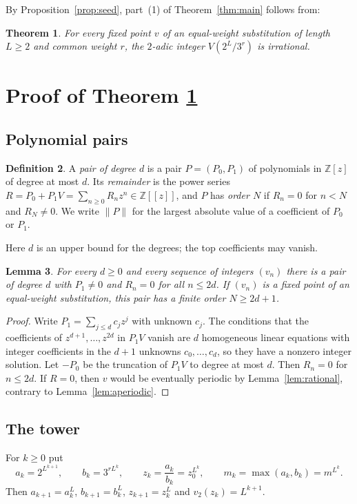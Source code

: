 \documentclass[11pt,reqno]{amsart}
\newtheorem{theorem}{Theorem}[section]
\newtheorem{lemma}[theorem]{Lemma}
\theoremstyle{definition}
\newtheorem{definition}[theorem]{Definition}
\theoremstyle{remark}
\newcommand{\Z}{\mathbb{Z}}
\newcommand{\vt}{v_2}
\begin{document}
By Proposition~\ref{prop:seed}, part~(1) of Theorem~\ref{thm:main} follows
from:

\begin{theorem}\label{thm:value}
For every fixed point $v$ of an equal-weight substitution of length $L\ge 2$
and common weight $r$, the $2$-adic integer $V(2^{L}/3^{r})$ is irrational.
\end{theorem}

\section{Proof of Theorem \ref{thm:value}}\label{sec:proof}

\subsection{Polynomial pairs}

\begin{definition}
A \emph{pair of degree $d$} is a pair $P=(P_0,P_1)$ of polynomials in
$\Z[z]$ of degree at most $d$.  Its \emph{remainder} is the power series
$R=P_0+P_1V=\sum_{n\ge 0}R_nz^{n}\in\Z[[z]]$, and $P$ has \emph{order $N$}
if $R_n=0$ for $n<N$ and $R_N\ne 0$.  We write $\|P\|$ for the largest
absolute value of a coefficient of $P_0$ or $P_1$.
\end{definition}

Here $d$ is an upper bound for the degrees; the top coefficients may vanish.

\begin{lemma}\label{lem:pair}
For every $d\ge 0$ and every sequence of integers $(v_n)$ there is a pair
of degree $d$ with $P_1\ne 0$ and $R_n=0$ for all $n\le 2d$.  If $(v_n)$ is
a fixed point of an equal-weight substitution, this pair has a finite
order $N\ge 2d+1$.
\end{lemma}

\begin{proof}
Write $P_1=\sum_{j\le d}c_jz^{j}$ with unknown $c_j$.  The conditions that
the coefficients of $z^{d+1},\dots,z^{2d}$ in $P_1V$ vanish are $d$
homogeneous linear equations with integer coefficients in the $d+1$
unknowns $c_0,\dots,c_d$, so they have a nonzero integer solution.  Let
$-P_0$ be the truncation of $P_1V$ to degree at most $d$.  Then $R_n=0$ for
$n\le 2d$.  If $R=0$, then $v$ would be eventually periodic by
Lemma~\ref{lem:rational}, contrary to Lemma~\ref{lem:aperiodic}.
\end{proof}

\subsection{The tower}
For $k\ge 0$ put
\[
  a_k=2^{L^{k+1}},\qquad b_k=3^{rL^{k}},\qquad
  z_k=\frac{a_k}{b_k}=z_0^{L^{k}},\qquad m_k=\max(a_k,b_k)=m^{L^{k}} .
\]
Then $a_{k+1}=a_k^{L}$, $b_{k+1}=b_k^{L}$, $z_{k+1}=z_k^{L}$ and
$\vt(z_k)=L^{k+1}$.
\end{document}
